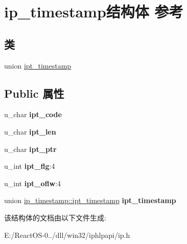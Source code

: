 \hypertarget{structip__timestamp}{}\section{ip\+\_\+timestamp结构体 参考}
\label{structip__timestamp}
\subsection*{类}
\begin{DoxyCompactItemize}
\item 
union \hyperlink{unionip__timestamp_1_1ipt__timestamp}{ipt\+\_\+timestamp}
\end{DoxyCompactItemize}
\subsection*{Public 属性}
\begin{DoxyCompactItemize}
\item 
\mbox{\label{structip__timestamp_acef74409bb1cd69f42fd01ba477e84fd}} 
u\+\_\+char {\bfseries ipt\+\_\+code}
\item 
\mbox{\label{structip__timestamp_aaa11624ff6570272524d53d862437cc9}} 
u\+\_\+char {\bfseries ipt\+\_\+len}
\item 
\mbox{\label{structip__timestamp_aa1f551b443486c3ff9637e3ba7c99b34}} 
u\+\_\+char {\bfseries ipt\+\_\+ptr}
\item 
\mbox{\label{structip__timestamp_a8ef0f4688bb695fea293ee936a1d4fe3}} 
u\+\_\+int {\bfseries ipt\+\_\+flg}\+:4
\item 
\mbox{\label{structip__timestamp_aa4788dceacb73d8f633e6240dfb958df}} 
u\+\_\+int {\bfseries ipt\+\_\+oflw}\+:4
\item 
\mbox{\label{structip__timestamp_a73e357acc8191ebf842bb45a9ea0deca}} 
union \hyperlink{unionip__timestamp_1_1ipt__timestamp}{ip\+\_\+timestamp\+::ipt\+\_\+timestamp} {\bfseries ipt\+\_\+timestamp}
\end{DoxyCompactItemize}


该结构体的文档由以下文件生成\+:\begin{DoxyCompactItemize}
\item 
E\+:/\+React\+O\+S-\/0../dll/win32/iphlpapi/ip.\+h\end{DoxyCompactItemize}
